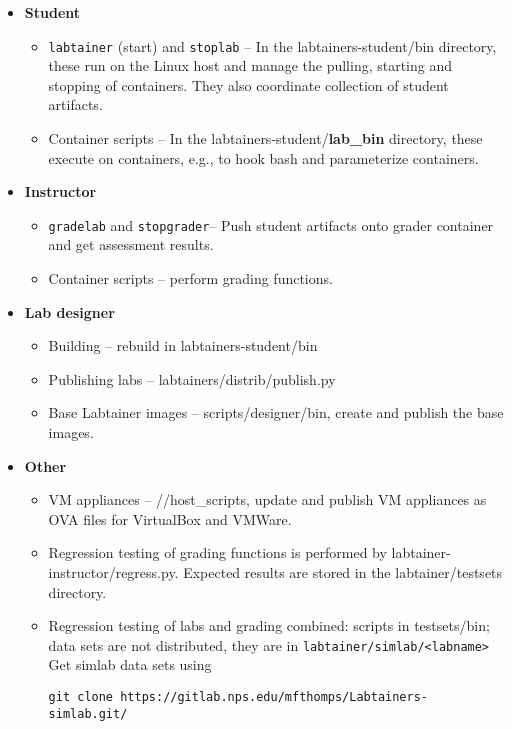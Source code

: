 \documentclass[12pt]{article}
\begin{document}
\begin{itemize}
	\item {\bf Student} \begin{itemize}
\item {\tt labtainer} (start) and {\tt stoplab} -- In the labtainers-student/bin directory, these run on the 
Linux host and manage the pulling, starting and stopping of containers.  They also coordinate
collection of student artifacts.
\item Container scripts -- In the labtainers-student/{\bf lab\_bin} directory, these execute on
containers, e.g., to hook bash and parameterize containers.
	\end{itemize}

	\item {\bf Instructor} \begin{itemize}
\item {\tt gradelab} and {\tt stopgrader}-- Push student artifacts onto grader container and get assessment results.
\item Container scripts -- perform grading functions.
	\end{itemize}

	\item {\bf Lab designer} \begin{itemize}
\item Building -- rebuild in labtainers-student/bin 
\item Publishing labs -- labtainers/distrib/publish.py
\item Base Labtainer images -- scripts/designer/bin, create and publish the base images.
	\end{itemize}	

	\item {\bf Other} \begin{itemize}
\item VM appliances -- //host\_scripts, update and publish VM appliances as OVA files for 
VirtualBox and VMWare.
\item Regression testing of grading functions is performed by labtainer-instructor/regress.py.
Expected results are stored in the labtainer/testsets directory.
\item Regression testing of labs and grading combined: scripts in testsets/bin; data sets
are not distributed, they are in {\tt labtainer/simlab/<labname>}  Get simlab data sets using
\begin{verbatim}
git clone https://gitlab.nps.edu/mfthomps/Labtainers-simlab.git/
\end{verbatim}

       \end{itemize}

\end{itemize}
\end{document}
